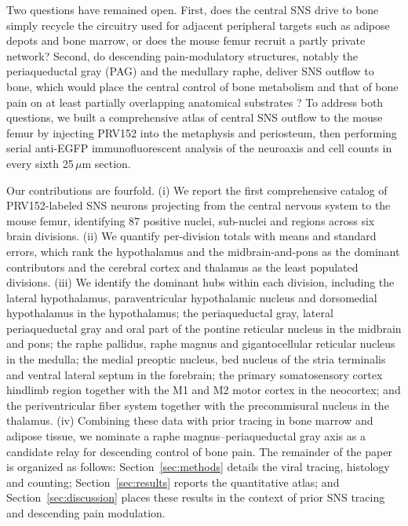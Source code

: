 \documentclass[11pt]{article}
\begin{document}
Two questions have remained open. First, does the central SNS drive to bone simply recycle the circuitry used for adjacent peripheral targets such as adipose depots and bone marrow, or does the mouse femur recruit a partly private network? Second, do descending pain-modulatory structures, notably the periaqueductal gray (PAG) and the medullary raphe, deliver SNS outflow to bone, which would place the central control of bone metabolism and that of bone pain on at least partially overlapping anatomical substrates \citep{francois2017brainstem,heinricher2009descending,benarroch2012postural}? To address both questions, we built a comprehensive atlas of central SNS outflow to the mouse femur by injecting PRV152 into the metaphysis and periosteum, then performing serial anti-EGFP immunofluorescent analysis of the neuroaxis and cell counts in every sixth 25\,$\mu$m section.

Our contributions are fourfold. (i) We report the first comprehensive catalog of PRV152-labeled SNS neurons projecting from the central nervous system to the mouse femur, identifying 87 positive nuclei, sub-nuclei and regions across six brain divisions. (ii) We quantify per-division totals with means and standard errors, which rank the hypothalamus and the midbrain-and-pons as the dominant contributors and the cerebral cortex and thalamus as the least populated divisions. (iii) We identify the dominant hubs within each division, including the lateral hypothalamus, paraventricular hypothalamic nucleus and dorsomedial hypothalamus in the hypothalamus; the periaqueductal gray, lateral periaqueductal gray and oral part of the pontine reticular nucleus in the midbrain and pons; the raphe pallidus, raphe magnus and gigantocellular reticular nucleus in the medulla; the medial preoptic nucleus, bed nucleus of the stria terminalis and ventral lateral septum in the forebrain; the primary somatosensory cortex hindlimb region together with the M1 and M2 motor cortex in the neocortex; and the periventricular fiber system together with the precommisural nucleus in the thalamus. (iv) Combining these data with prior tracing in bone marrow and adipose tissue, we nominate a raphe magnus--periaqueductal gray axis as a candidate relay for descending control of bone pain. The remainder of the paper is organized as follows: Section~\ref{sec:methods} details the viral tracing, histology and counting; Section~\ref{sec:results} reports the quantitative atlas; and Section~\ref{sec:discussion} places these results in the context of prior SNS tracing and descending pain modulation.
\end{document}
